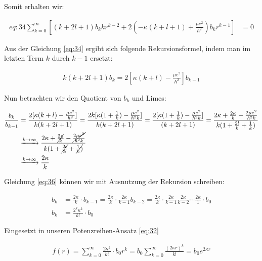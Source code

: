 Somit erhalten wir:

\begin{align}{eq:34}
  \label{eq:34}
   \sum^{\infty}_{k=0} \left[ (k+2l+1)b_k k r^{k-2}+ 2 \left(-\kappa(k+l+1) + \frac{\mu e^2}{\hbar^2}  \right)   b_k r^{k-1} \right]  &= 0 
\end{align}

Aus der Gleichung \eqref{eq:34} ergibt sich folgende Rekursionsformel, indem man im letzten Term \(k\) durch \(k-1\) ersetzt:

\begin{align}
  \label{eq:35}
  k(k+2l+1)b_k = 2\left[ \kappa(k+l)-\frac{\mu e^2}{\hbar^2}\right] b_{k-1}
\end{align}

Nun betrachten wir den Quotient von \(b_k\) und Limes:

\begin{align}
  \frac{b_k}{b_{k-1}} &= \frac{2[\kappa(k+l)-\frac{\mu e^2}{\hbar^2}]}{ k(k+2l+1)} 
 = \frac{2k[\kappa(1+\frac{1}{k})-\frac{\mu e^2}{\hbar^2 k}]}{ k(k+2l+1)} 
 = \frac{2[\kappa(1+\frac{1}{k})-\frac{\mu e^2}{\hbar^2 k}]}{ (k+2l+1)}
 = \frac{2\kappa+\frac{2\kappa}{k}-\frac{2\mu e^2}{\hbar^2 k}}{ k(1+\frac{2l}{k}+\frac{1}{k})}\notag\\
 &\xrightarrow{k\to \infty}  \frac{2\kappa+\cancel{\frac{2\kappa}{k}}-\cancel{\frac{2\mu e^2}{\hbar^2 k}}}{ k(1+\cancel{\frac{2l}{k}}+\cancel{\frac{1}{k})}}\notag\\
&\xrightarrow{k\to \infty}  \frac{2\kappa}{k}\label{eq:36}
\end{align}

Gleichung \eqref{eq:36} können wir mit Ausnutzung der Rekursion schreiben:

\begin{align}
  \label{eq:37}
  b_k &= \frac{2\kappa}{k}\cdot b_{k-1} = \frac{2\kappa}{k}\cdot \frac{2\kappa}{k-1} b_{k-2} = \frac{2\kappa}{k}\cdot \frac{2\kappa}{k-1} \frac{2\kappa}{k-2}\cdots \frac{2\kappa}{1} \cdot b_0 \\
b_k &=  \frac{2^k\kappa^k}{k!}\cdot b_0
\end{align}

Eingesetzt in unseren Potenzreihen-Ansatz \eqref{eq:32}

\begin{align}
  \label{eq:38}
    f(r) = \sum^{\infty}_{k=0} \frac{2\kappa^k}{k!}\cdot b_0  r^k = b_0 \sum^{\infty}_{k=0} \frac{(2\kappa r)^k}{k!} = b_0 e^{2\kappa r} 
\end{align}

